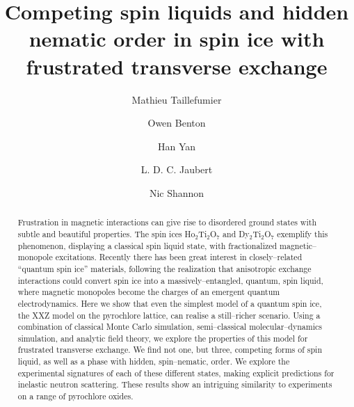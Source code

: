 \documentclass[apsrev4-1,prx,superscriptaddress,floatfix,twocolumn,longbibliography]{revtex4-1}
\begin{document}

\captionsetup[subfloat]{position=top}

\title{Competing spin liquids and hidden nematic order in spin ice with 
frustrated transverse exchange}

\author{Mathieu Taillefumier}

\author{Owen Benton}

\author{Han Yan}

\author{L. D. C. Jaubert}

\author{Nic Shannon}

\begin{abstract}

Frustration in magnetic interactions can give rise 
to disordered ground states with subtle and beautiful properties.
%
The spin ices Ho$_2$Ti$_2$O$_7$ and Dy$_2$Ti$_2$O$_7$ 
exemplify this phenomenon, displaying a classical spin liquid state, 
with fractionalized magnetic--monopole excitations.   
%
Recently there has been great interest in closely--related ``quantum
spin ice'' materials, following the realization that anisotropic
exchange interactions could convert spin ice into a
massively--entangled, quantum, spin liquid, where magnetic monopoles
become the charges of an emergent quantum electrodynamics.
%
Here we show that even the simplest model of a quantum 
spin ice, the XXZ model on the pyrochlore lattice, can realise a still--richer 
scenario.
%
Using a combination of classical Monte Carlo simulation, 
semi--classical molecular--dynamics simulation, and analytic field theory, 
we explore the properties of this model for frustrated transverse exchange.
%   
We find not one, but three, competing forms of spin liquid, 
as well as a phase with hidden, spin--nematic, order.
%
We explore the experimental signatures of each of these different 
states, making explicit predictions for inelastic neutron scattering. 
%
These results show an intriguing similarity to experiments on a 
range of pyrochlore oxides.  

\end{abstract}
\end{document}
